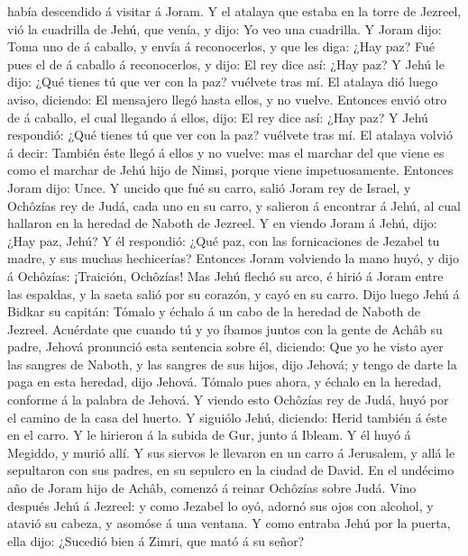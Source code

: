había descendido á visitar á Joram.  Y el atalaya que
estaba en la torre de Jezreel, vió la cuadrilla de Jehú, que venía, y
dijo: Yo veo una cuadrilla. Y Joram dijo: Toma uno de á caballo, y envía
á reconocerlos, y que les diga: ¿Hay paz?  Fué pues el de á
caballo á reconocerlos, y dijo: El rey dice así: ¿Hay paz? Y Jehú le
dijo: ¿Qué tienes tú que ver con la paz? vuélvete tras mí. El atalaya
dió luego aviso, diciendo: El mensajero llegó hasta ellos, y no vuelve.
 Entonces envió otro de á caballo, el cual llegando á
ellos, dijo: El rey dice así: ¿Hay paz? Y Jehú respondió: ¿Qué tienes tú
que ver con la paz? vuélvete tras mí.  El atalaya volvió á
decir: También éste llegó á ellos y no vuelve: mas el marchar del que
viene es como el marchar de Jehú hijo de Nimsi, porque viene
impetuosamente.  Entonces Joram dijo: Unce. Y uncido que
fué su carro, salió Joram rey de Israel, y Ochôzías rey de Judá, cada
uno en su carro, y salieron á encontrar á Jehú, al cual hallaron en la
heredad de Naboth de Jezreel.  Y en viendo Joram á Jehú,
dijo: ¿Hay paz, Jehú? Y él respondió: ¿Qué paz, con las fornicaciones de
Jezabel tu madre, y sus muchas hechicerías?  Entonces Joram
volviendo la mano huyó, y dijo á Ochôzías: ¡Traición, Ochôzías!
 Mas Jehú flechó su arco, é hirió á Joram entre las
espaldas, y la saeta salió por su corazón, y cayó en su carro.
 Dijo luego Jehú á Bidkar su capitán: Tómalo y échalo á un
cabo de la heredad de Naboth de Jezreel. Acuérdate que cuando tú y yo
íbamos juntos con la gente de Achâb su padre, Jehová pronunció esta
sentencia sobre él, diciendo:  Que yo he visto ayer las
sangres de Naboth, y las sangres de sus hijos, dijo Jehová; y tengo de
darte la paga en esta heredad, dijo Jehová. Tómalo pues ahora, y échalo
en la heredad, conforme á la palabra de Jehová.  Y viendo
esto Ochôzías rey de Judá, huyó por el camino de la casa del huerto. Y
siguiólo Jehú, diciendo: Herid también á éste en el carro. Y le hirieron
á la subida de Gur, junto á Ibleam. Y él huyó á Megiddo, y murió allí.
 Y sus siervos le llevaron en un carro á Jerusalem, y allá
le sepultaron con sus padres, en su sepulcro en la ciudad de David.
 En el undécimo año de Joram hijo de Achâb, comenzó á
reinar Ochôzías sobre Judá.  Vino después Jehú á Jezreel: y
como Jezabel lo oyó, adornó sus ojos con alcohol, y atavió su cabeza, y
asomóse á una ventana.  Y como entraba Jehú por la puerta,
ella dijo: ¿Sucedió bien á Zimri, que mató á su señor? 
